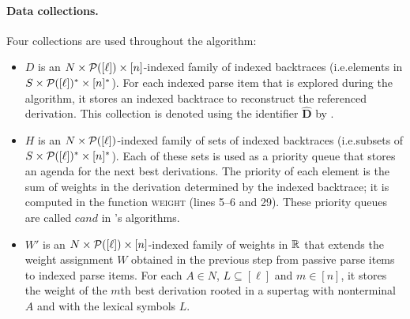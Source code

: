 \documentclass[../../document.tex]{subfiles}
\begin{document}
    \paragraph{Data collections.}
    Four collections are used throughout the algorithm:
    \begin{itemize}
        \item \(D\) is an \(N \times \mathcal{P}([\ell]) \times [n]\)-indexed family of indexed backtraces (i.e.\@ elements in \(S \times \mathcal{P}([\ell])^* \times [n]^*\)).
            For each indexed parse item that is explored during the algorithm, it stores an indexed backtrace to reconstruct the referenced derivation.
            This collection is denoted using the identifier \(\widehat{\mathbf{D}}\) by .
        \item \(H\) is an \(N \times \mathcal{P}([\ell])\)-indexed family of sets of indexed backtraces (i.e.\@ subsets of \(S \times \mathcal{P}([\ell])^* \times [n]^*\)).
            Each of these sets is used as a priority queue that stores an agenda for the next best derivations.
            The priority of each element is the sum of weights in the derivation determined by the indexed backtrace; it is computed in the function \textsc{weight} (lines 5--6 and 29).
            These priority queues are called \(\mathit{cand}\) in 's algorithms.
        \item \(W'\) is an \(N \times \mathcal{P}([\ell]) \times [n]\)-indexed family of weights in \(\mathbb{R}\) that extends the weight assignment \(W\) obtained in the previous step from passive parse items to indexed parse items.
            For each \(A\in N\), \(L \subseteq [\ell]\) and \(m \in [n]\), it stores the weight of the \(m\)th best derivation rooted in a supertag with  nonterminal \(A\) and with the lexical symbols \(L\).
    \end{itemize}
\end{document}
